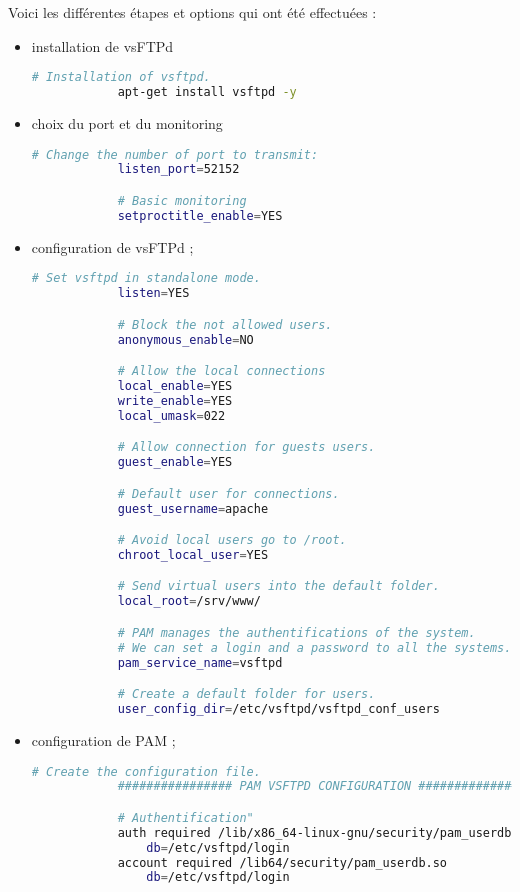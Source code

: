 Voici les différentes étapes et options qui ont été effectuées :
\begin{itemize}
    \item installation de vsFTPd

        \begin{lstlisting}[language=bash]
            # Installation of vsftpd.
            apt-get install vsftpd -y
        \end{lstlisting}

    \item choix du port et du monitoring

        \begin{lstlisting}[language=bash]
            # Change the number of port to transmit:
            listen_port=52152

            # Basic monitoring
            setproctitle_enable=YES
        \end{lstlisting}

    \newpage
    \item configuration de vsFTPd ;

        \begin{lstlisting}[language=bash]
            # Set vsftpd in standalone mode.
            listen=YES

            # Block the not allowed users.
            anonymous_enable=NO

            # Allow the local connections
            local_enable=YES
            write_enable=YES
            local_umask=022

            # Allow connection for guests users.
            guest_enable=YES

            # Default user for connections.
            guest_username=apache

            # Avoid local users go to /root.
            chroot_local_user=YES

            # Send virtual users into the default folder.
            local_root=/srv/www/

            # PAM manages the authentifications of the system.
            # We can set a login and a password to all the systems.
            pam_service_name=vsftpd

            # Create a default folder for users.
            user_config_dir=/etc/vsftpd/vsftpd_conf_users
        \end{lstlisting}

    \newpage
    \item configuration de PAM ;

        \begin{lstlisting}[language=bash]
            # Create the configuration file.
            ################ PAM VSFTPD CONFIGURATION ###############

            # Authentification"
            auth required /lib/x86_64-linux-gnu/security/pam_userdb.so
                db=/etc/vsftpd/login
            account required /lib64/security/pam_userdb.so
                db=/etc/vsftpd/login
        \end{lstlisting}

\end{itemize}


